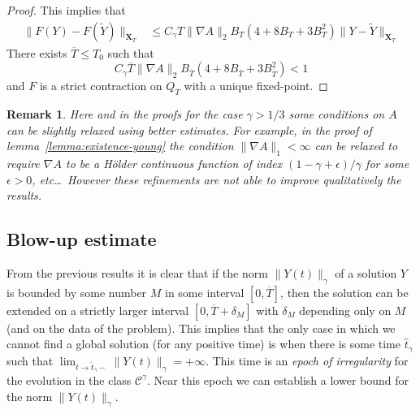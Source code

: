 \documentclass[a4paper,12pt,reqno]{amsart}
\makeatletter
\newcommand{\eqcolon}{\mathrel{\mathord{=}\raise.2\p@\hbox{:}}}
\newcommand{\wt}{\widetilde}
\newcommand{\norm}[1]{\|#1\|}
\newtheorem{remark}{Remark}
\newcommand{\CC}{\mathscr{C}}
\newcommand{\XT}{\mathbf{X}_T}
\makeatother
\begin{document}
\begin{proof}
This implies that
\begin{equation*}
  \begin{split}
\|F(Y)-F(\wt Y)\|_{\XT}  & \le
C_\gamma T \norm{\nabla A}_2 B_T(4 + 8 B_T + 3 B_T^2) \norm{Y-\wt
 Y}_{\XT}
  \end{split}
\end{equation*}
There exists $\overline{T} \le T_0$ such that
$$
C_\gamma \overline{T} \norm{\nabla A}_2 B_{\overline{T}}(4 + 8 B_{\overline{T}} + 3 B_{\overline{T}}^2) < 1
$$
and $F$   is a strict contraction on $Q_{\overline{T}}$ with a unique fixed-point.

\end{proof}



\begin{remark}
Here and in the proofs for the case $\gamma > 1/3$ some conditions on
$A$ can be slightly relaxed using better estimates. For example, in
the proof of lemma~\ref{lemma:existence-young} the condition $\|\nabla
A\|_1 < \infty$ can be relaxed to require $\nabla A$ to be a H\"older
continuous function of index $(1-\gamma+\epsilon)/\gamma$ for some
$\epsilon > 0$, etc\dots\ However these refinements are not able to improve
qualitatively the results.
\end{remark}



\subsection{Blow-up estimate}

From the previous results it is clear that if the norm
$\|Y(t)\|_{\gamma}$ of a solution $Y$ is bounded by some number $M$  in some interval
$[0,\overline T]$, then the solution can be extended on a strictly
larger interval $[0,\overline T + \delta_M]$ with $\delta_M$ depending
only on $M$ (and on the data of the problem). This implies that the
only case in which we cannot find a global solution (for any positive
time) is when there is some time $\hat t_\gamma$ such that $\lim_{t\to \hat t_\gamma
  -} \|Y(t)\|_{\gamma} = +\infty$. This time is an \emph{epoch of
  irregularity} for the evolution in the class $\CC^\gamma$. Near this epoch we can establish a
lower bound for the norm $\|Y(t)\|_{\gamma}$.
\end{document}
